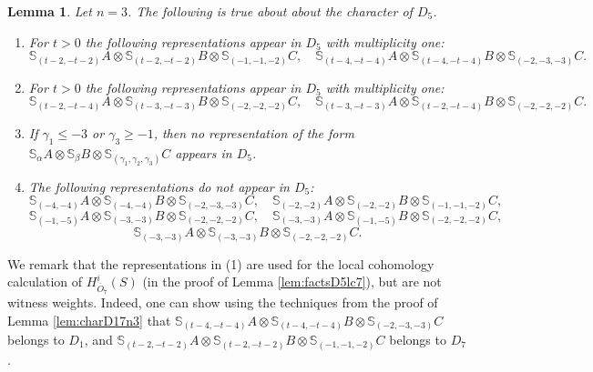 \documentclass[11pt,reqno]{amsart}
\newcommand{\oo}{\otimes}
\newcommand{\bS}{\mathbb{S}}
\newcommand{\ol}[1]{\overline{#1}}
\newtheorem{lemma}[theorem]{Lemma}
\numberwithin{equation}{section}
\begin{document}
\begin{lemma}\label{lem:charD5n3}
Let $n=3$. The following is true about about the character of $D_5$.
\begin{enumerate}
\item For $t>0$ the following representations appear in $D_5$ with multiplicity one:
$$
\bS_{(t-2,-t-2)}A\oo \bS_{(t-2,-t-2)}B \oo \bS_{(-1,-1,-2)}C,\quad \bS_{(t-4,-t-4)}A\oo \bS_{(t-4,-t-4)}B \oo \bS_{(-2,-3,-3)}C.
$$

\item For $t>0$ the following representations appear in $D_5$ with multiplicity one:
$$
\bS_{(t-2,-t-4)}A\oo \bS_{(t-3,-t-3)}B \oo \bS_{(-2,-2,-2)}C,\quad \bS_{(t-3,-t-3)}A\oo \bS_{(t-2,-t-4)}B \oo \bS_{(-2,-2,-2)}C.
$$
\item If $\gamma_1\leq -3$ or $\gamma_3\geq -1$, then no representation of the form $\bS_{\alpha}A\oo \bS_{\beta}B \oo \bS_{(\gamma_1,\gamma_2,\gamma_3)}C$ appears in $D_5$. 

\item The following representations do not appear in $D_5$:
$$
\bS_{(-4,-4)}A\oo \bS_{(-4,-4)}B \oo \bS_{(-2,-3,-3)}C,\quad \bS_{(-2,-2)}A\oo \bS_{(-2,-2)}B \oo \bS_{(-1,-1,-2)}C,
$$
$$
\bS_{(-1,-5)}A\oo \bS_{(-3,-3)}B \oo \bS_{(-2,-2,-2)}C,\quad \bS_{(-3,-3)}A\oo \bS_{(-1,-5)}B \oo \bS_{(-2,-2,-2)}C,
$$
$$
\bS_{(-3,-3)}A\oo \bS_{(-3,-3)}B \oo \bS_{(-2,-2,-2)}C.
$$
\end{enumerate}

\end{lemma}

We remark that the representations in (1) are used for the local cohomology calculation of $H^i_{\ol{O}_7}(S)$ (in the proof of Lemma \ref{lem:factsD5lc7}), but are not witness weights. Indeed, one can show using the techniques from the proof of Lemma \ref{lem:charD17n3} that $\bS_{(t-4,-t-4)}A\oo \bS_{(t-4,-t-4)}B \oo \bS_{(-2,-3,-3)}C$ belongs to $D_1$, and $\bS_{(t-2,-t-2)}A\oo \bS_{(t-2,-t-2)}B \oo \bS_{(-1,-1,-2)}C$ belongs to $D_7$.
\end{document}
